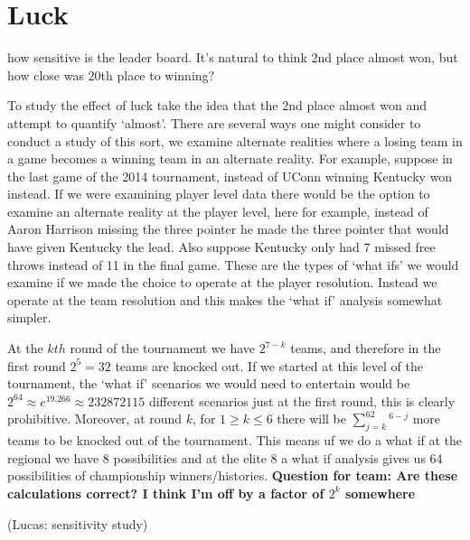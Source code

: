 \section{Luck}
how sensitive is the leader board. It's natural to think 2nd place almost won, but how close was 20th place to winning? 


To study the effect of luck take the idea that the 2nd place almost won and attempt to quantify `almost'. There are several ways one might consider to conduct a study of this sort, we examine alternate realities where a losing team in a game becomes a winning team in an alternate reality. For example, suppose in the last game of the 2014 tournament, instead of UConn winning Kentucky won instead. If we were examining player level data there would be the option to examine an alternate reality at the player level, here for example, instead of Aaron Harrison missing the three pointer he made the three pointer that would have given Kentucky the lead. Also suppose Kentucky only had 7 missed free throws instead of 11 in the final game. These are the types of `what ifs' we would examine if we made the choice to operate at the player resolution. Instead we operate at the team resolution and this makes the `what if' analysis somewhat simpler. 

At the $kth$ round of the tournament we have $2^{7-k}$ teams, and therefore in the first round $2^5 = 32$ teams are knocked out. If we started at this level of the tournament, the `what if' scenarios we would need to entertain would be $2^64 \approx e^{19.266}\approx 232872115$ different scenarios just at the first round, this is clearly prohibitive. Moreover, at round $k$, for $1\geq k \leq 6$ there will be $\sum_{j=k}^62^{6-j}$ more teams to be knocked out of the tournament. This means uf we do a what if at the regional we have 8 possibilities and at the elite 8 a what if analysis gives us 64 possibilities of championship winners/histories. \textbf{Question for team: Are these calculations correct? I think I'm off by a factor of $2^k$ somewhere}


(Lucas: sensitivity study)
